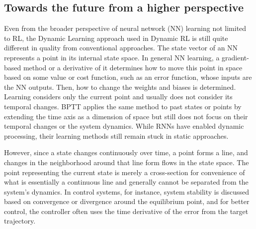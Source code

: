 \subsection{Towards the future from a higher perspective}\label{subsec:Future}
Even from the broader perspective of neural network (NN) learning not limited to RL,
the Dynamic Learning approach used in Dynamic RL is still quite different in quality from conventional approaches.
The state vector of an NN represents a point in its internal state space.
In general NN learning, a gradient-based method or a derivative of it determines
how to move this point in space based on some value or cost function, such as an error function,
whose inputs are the NN outputs.
Then, how to change the weights and biases is determined.
Learning considers only the current point and usually does not consider its temporal changes.
BPTT applies the same method to past states or points by extending the time axis as a dimension of space
but still does not focus on their temporal changes or the system dynamics.
While RNNs have enabled dynamic processing, their learning methods still remain stuck in static approaches.

However, since a state changes continuously over time, a point forms a line,
and changes in the neighborhood around that line form flows in the state space.
The point representing the current state is merely a cross-section for convenience
of what is essentially a continuous line and generally cannot be separated from the system's dynamics.
In control systems, for instance,
system stability is discussed based on convergence or divergence around the equilibrium point,
and for better control, the controller often uses the time derivative of the error from the target trajectory.


